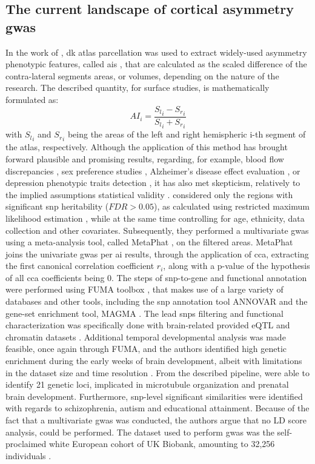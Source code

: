 \subsection{The current landscape of cortical asymmetry \ac{gwas}} 
 In the work of \citet{Sha2021}, \ac{dk} atlas parcellation was used to extract widely-used asymmetry phenotypic features, called \acfp{ai} \cite{Graham2022,Sarica2018,Kong2018,Savic2008,Zuo2019}, that are calculated as the scaled difference of the contra-lateral segments areas, or volumes, depending on the nature of the research. The described quantity, for surface studies, is mathematically formulated as:
$$
AI_i = \frac{{S_l}_i-{S_r}_i}{{S_l}_i+{S_r}_i}
$$
with ${S_l}_i$ and ${S_r}_i$ being the areas of the left and right hemispheric i-th segment of the atlas, respectively. Although the application of this method has brought forward plausible and promising results, regarding, for example, blood flow discrepancies \cite{Graham2022}, sex preference studies \cite{Savic2008}, Alzheimer's disease effect evaluation \cite{Sarica2018},  or depression phenotypic traits detection \cite{Zuo2019}, it has also met skepticism, relatively to the implied assumptions statistical validity \cite{Coles2008}. \citet{Sha2021} considered only the regions with significant \ac{snp} heritability ($FDR>0.05$), as calculated using restricted maximum likelihood estimation \cite{Yang2010}, while at the same time controlling for age, ethnicity, data collection and other covariates. Subsequently, they performed a multivariate \ac{gwas}  using a meta-analysis tool, called MetaPhat \cite{Lin2020}, on the filtered areas. MetaPhat joins the univariate \ac{gwas} per \ac{ai} results, through the application of \ac{cca}, extracting the first canonical correlation coefficient $r_i$, along with a p-value of the hypothesis of all \ac{cca} coefficients being 0. The steps of snp-to-gene and functional annotation were performed using FUMA toolbox \cite{Watanabe2017}, that makes use of a large variety of databases and other tools, including the \ac{snp} annotation tool ANNOVAR \cite{Wang2010} and  the gene-set enrichment tool, MAGMA \cite{DeLeeuw2015}. The lead \acp{snp} filtering and functional characterization was specifically done with brain-related provided eQTL and chromatin datasets \cite{Sha2021}. Additional temporal developmental analysis was made feasible, once again through FUMA, and the authors identified high genetic enrichment during the early weeks of brain development, albeit with limitations in the dataset size and time resolution \cite{Kang2011}.  From the described pipeline, \citet{Sha2021} were able to identify 21 genetic loci, implicated in microtubule organization and prenatal brain development. Furthermore, \ac{snp}-level significant similarities were identified with regards to schizophrenia, autism and educational attainment\cite{Sha2021}. Because of the fact that a multivariate \ac{gwas} was conducted, the authors argue that no LD score analysis, could be performed. The dataset used to perform \ac{gwas} was the self-proclaimed white European cohort of UK Biobank, amounting to 32,256 individuals \cite{Littlejohns2020}.

